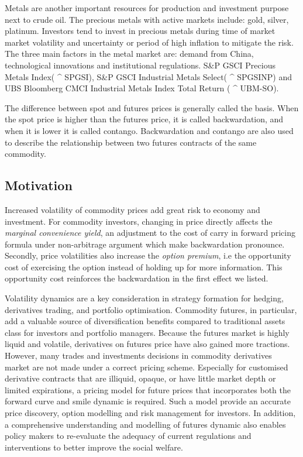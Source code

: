 Metals are another important resources for production and investment purpose next to crude oil. The precious metals with active markets include: gold, silver, platinum.  Investors tend to invest in precious metals during time of market market volatility and uncertainty or period of high inflation to mitigate the risk. The three main factors in the metal market are: demand from China, technological  innovations and  institutional regulations. S\&P GSCI Precious Metals Index( \string^ SPGSI), S\&P GSCI Industrial Metals Select( \string^ SPGSINP) and UBS Bloomberg CMCI Industrial Metals Index Total Return ( \string^ UBM-SO).

The difference between spot and futures prices is generally called the basis. When the spot price is higher than the futures price, it is called backwardation, and when it is lower it is called contango. Backwardation and contango are also used to describe the relationship between two futures contracts of the same commodity.







\subsection{Motivation}
Increased volatility of commodity prices add great risk to economy and investment. For commodity investors, changing in price directly affects the \textit{marginal convenience yield}, an adjustment to the cost of carry in forward pricing formula under non-arbitrage argument which make backwardation pronounce. Secondly, price volatilities also increase the \textit{option premium}, i.e the opportunity cost of exercising the option instead of holding up for more information\parencite{pindyck}. This opportunity cost reinforces the backwardation in the first effect we listed\parencite{litzenberger}. 

Volatility dynamics are a key consideration in strategy formation for hedging, derivatives
trading, and portfolio optimisation. Commodity futures, in particular, add a valuable source of diversification benefits compared to traditional assets class for investors and portfolio managers. Because the futures market is highly liquid and volatile, derivatives on futures price have also gained more tractions. However, many trades and investments decisions in commodity derivatives market are not made under a correct pricing scheme. Especially for customised derivative contracts that are illiquid, opaque, or have little market depth or limited expirations, a pricing model for future prices that incorporates both the forward curve and smile dynamic is required. Such a model provide an accurate price discovery, option modelling and risk management for investors. In addition, a comprehensive understanding and modelling of futures dynamic also enables policy makers to re-evaluate the adequacy of current regulations and interventions to better improve the social welfare. 


